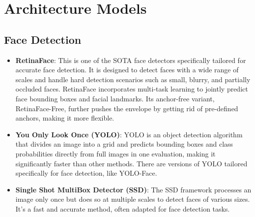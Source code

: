 \section{Architecture Models}

	\subsection{Face Detection}
		\begin{itemize}
			\item \textbf{RetinaFace}: This is one of the SOTA face detectors specifically tailored for accurate face detection. It is designed to detect faces with a wide range of scales and handle hard detection scenarios such as small, blurry, and partially occluded faces. RetinaFace incorporates multi-task learning to jointly predict face bounding boxes and facial landmarks. Its anchor-free variant, RetinaFace-Free, further pushes the envelope by getting rid of pre-defined anchors, making it more flexible.
			\item \textbf{You Only Look Once (YOLO)}: YOLO is an object detection algorithm that divides an image into a grid and predicts bounding boxes and class probabilities directly from full images in one evaluation, making it significantly faster than other methods. There are versions of YOLO tailored specifically for face detection, like YOLO-Face.
			\item \textbf{Single Shot MultiBox Detector (SSD)}: The SSD framework processes an image only once but does so at multiple scales to detect faces of various sizes. It's a fast and accurate method, often adapted for face detection tasks.
		\end{itemize}

